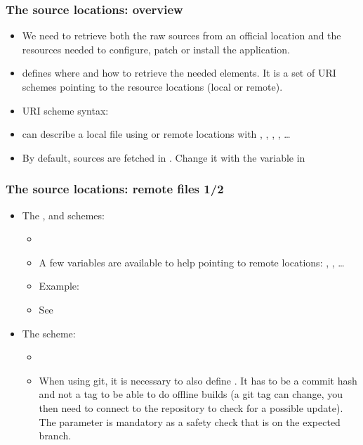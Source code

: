 \begin{frame}
  \frametitle{The source locations: overview}
  \begin{itemize}
    \item We need to retrieve both the raw sources from an official
      location and the resources needed to configure, patch or install
      the application.
    \item {} defines where and how to retrieve the
      needed elements. It is a set of URI schemes pointing to the
      resource locations (local or remote).
    \item URI scheme syntax: 
    \item {} can describe a local file using 
      or remote locations with , ,
      , , \dots
    \item By default, sources are fetched in
      . Change it with the 
      variable in 
  \end{itemize}
\end{frame}

\begin{frame}
  \frametitle{The source locations: remote files 1/2}
  \begin{itemize}
    \item The ,  and  schemes:
      \begin{itemize}
        \item {}
        \item A few variables are available to help pointing to remote
          locations: ,
          , \dots
        \item Example:
        \item See 
      \end{itemize}
    \item The  scheme:
      \begin{itemize}
        \item {}
        \item When using git, it is necessary to also define
          . It has to be a commit hash and not a tag to
          be able to do offline builds (a git tag can change, you then need
	  to connect to the repository to check for a possible update).
          The  parameter is mandatory as a safety check
          that  is on the expected branch.
      \end{itemize}
  \end{itemize}
\end{frame}

